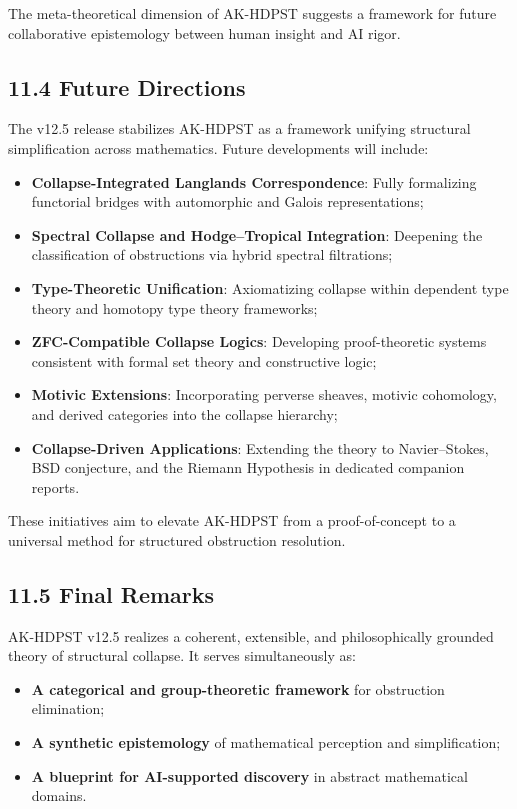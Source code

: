 \documentclass[11pt]{article}
\begin{document}
The meta-theoretical dimension of AK-HDPST suggests a framework for future collaborative epistemology between human insight and AI rigor.

\subsection*{11.4 Future Directions}

The v12.5 release stabilizes AK-HDPST as a framework unifying structural simplification across mathematics. Future developments will include:

\begin{itemize}
    \item \textbf{Collapse-Integrated Langlands Correspondence}: Fully formalizing functorial bridges with automorphic and Galois representations;
    \item \textbf{Spectral Collapse and Hodge–Tropical Integration}: Deepening the classification of obstructions via hybrid spectral filtrations;
    \item \textbf{Type-Theoretic Unification}: Axiomatizing collapse within dependent type theory and homotopy type theory frameworks;
    \item \textbf{ZFC-Compatible Collapse Logics}: Developing proof-theoretic systems consistent with formal set theory and constructive logic;
    \item \textbf{Motivic Extensions}: Incorporating perverse sheaves, motivic cohomology, and derived categories into the collapse hierarchy;
    \item \textbf{Collapse-Driven Applications}: Extending the theory to Navier–Stokes, BSD conjecture, and the Riemann Hypothesis in dedicated companion reports.
\end{itemize}

These initiatives aim to elevate AK-HDPST from a proof-of-concept to a universal method for structured obstruction resolution.

\subsection*{11.5 Final Remarks}

AK-HDPST v12.5 realizes a coherent, extensible, and philosophically grounded theory of structural collapse. It serves simultaneously as:

\begin{itemize}
    \item \textbf{A categorical and group-theoretic framework} for obstruction elimination;
    \item \textbf{A synthetic epistemology} of mathematical perception and simplification;
    \item \textbf{A blueprint for AI-supported discovery} in abstract mathematical domains.
\end{itemize}
\end{document}
